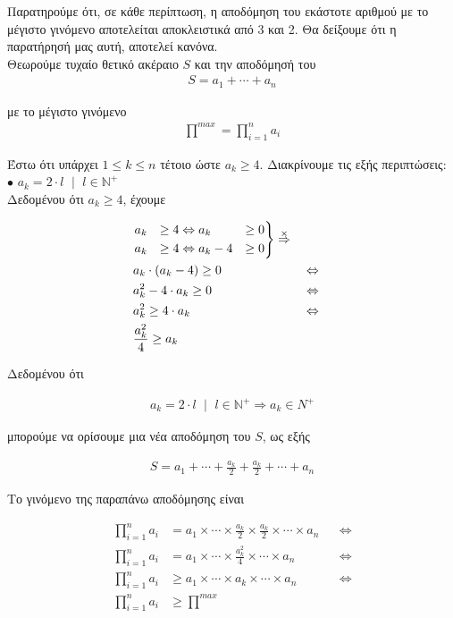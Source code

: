 \documentclass[12pt]{article}
\newcommand{\N}{\mathbb{N}}
\newcommand{\margin}{\hspace{4pt}}
\newcommand{\centered}[1]{\begin{align*}#1\end{align*}}
\newenvironment{rcases}
	{\left.\begin{aligned}}
	{\end{aligned}\right\rbrace}
\begin{document}
Παρατηρούμε ότι, σε κάθε περίπτωση, η αποδόμηση του εκάστοτε αριθμού με το μέγιστο γινόμενο αποτελείται αποκλειστικά από 3 και 2.
Θα δείξουμε ότι η παρατήρησή μας αυτή, αποτελεί κανόνα. \\

Θεωρούμε τυχαίο θετικό ακέραιο \( S \) και την αποδόμησή του \\

\centered{S = a_1 + \dotsb + a_n}

με το μέγιστο γινόμενο \\

\centered{\stackrel{max}{\prod} = \prod_{i = 1}^{n} a_i}

Έστω ότι υπάρχει \( 1 \leq k \leq n \) τέτοιο ώστε \( a_k \geq 4 \).
Διακρίνουμε τις εξής περιπτώσεις: \\

\( \bullet \) \( a_k = 2 \cdot l \margin \mid \margin l \in \N^+ \) \\

Δεδομένου ότι \( a_k \geq 4 \), έχουμε

\begin{align*}
    &\begin{rcases}
        a_k & & \geq 4 & \Leftrightarrow a_k & \geq 0 \\
        a_k & & \geq 4 & \Leftrightarrow a_k - 4 & \geq 0
    \end{rcases}
    \stackrel{\times}{\Rightarrow} \\
    &a_k \cdot (a_k - 4) \geq 0 && \Leftrightarrow \\
    &a_k^2 - 4 \cdot a_k \geq 0 && \Leftrightarrow \\
    &a_k^2 \geq 4 \cdot a_k && \Leftrightarrow \\
    &\frac{a_k^2}{4} \geq a_k
\end{align*}

Δεδομένου ότι

\centered{a_k = 2 \cdot l \margin \mid \margin l \in \N^+ \Rightarrow a_k \in N^+}

μπορούμε να ορίσουμε μια νέα αποδόμηση του \( S \), ως εξής

\centered{S = a_1 + \dotsb + \frac{a_k}{2} + \frac{a_k}{2} + \dotsb + a_n}

Το γινόμενο της παραπάνω αποδόμησης είναι

\begin{align*}
    \prod_{i = 1}^{n} a_i & = a_1 \times \dotsb \times \frac{a_k}{2} \times \frac{a_k}{2} \times \dotsb \times a_n && \Leftrightarrow \\
    \prod_{i = 1}^{n} a_i & = a_1 \times \dotsb \times \frac{a_k^2}{4} \times \dotsb \times a_n && \Leftrightarrow \\
    \prod_{i = 1}^{n} a_i & \geq a_1 \times \dotsb \times a_k \times \dotsb \times a_n && \Leftrightarrow \\
    \prod_{i = 1}^{n} a_i & \geq \stackrel{max}{\prod}
\end{align*}
\end{document}

